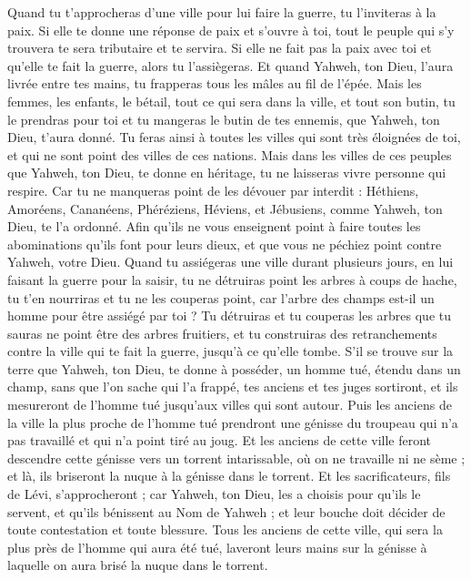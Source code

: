\begin{multicols}{2}
Quand tu t'approcheras d'une ville pour lui faire la guerre, tu l’inviteras à la paix.
Si elle te donne une réponse de paix et s’ouvre à toi, tout le peuple qui s’y trouvera te sera tributaire et te servira.
Si elle ne fait pas la paix avec toi et qu'elle te fait la guerre, alors tu l’assiègeras.
Et quand Yahweh, ton Dieu, l'aura livrée entre tes mains, tu frapperas tous les mâles au fil de l’épée.
Mais les femmes, les enfants, le bétail, tout ce qui sera dans la ville, et tout son butin, tu le prendras pour toi et tu mangeras le butin de tes ennemis, que Yahweh, ton Dieu, t'aura donné.
Tu feras ainsi à toutes les villes qui sont très éloignées de toi, et qui ne sont point des villes de ces nations.
Mais dans les villes de ces peuples que Yahweh, ton Dieu, te donne en héritage, tu ne laisseras vivre personne qui respire.
Car tu ne manqueras point de les dévouer par interdit : Héthiens, Amoréens, Cananéens, Phéréziens, Héviens, et Jébusiens, comme Yahweh, ton Dieu, te l'a ordonné.
Afin qu'ils ne vous enseignent point à faire toutes les abominations qu'ils font pour leurs dieux, et que vous ne péchiez point contre Yahweh, votre Dieu.
Quand tu assiégeras une ville durant plusieurs jours, en lui faisant la guerre pour la saisir, tu ne détruiras point les arbres à coups de hache, tu t’en nourriras et tu ne les couperas point, car l'arbre des champs est-il un homme pour être assiégé par toi ?
Tu détruiras et tu couperas les arbres que tu sauras ne point être des arbres fruitiers, et tu construiras des retranchements contre la ville qui te fait la guerre, jusqu'à ce qu'elle tombe.
\VerseOne{}S’il se trouve sur la terre que Yahweh, ton Dieu, te donne à posséder, un homme tué, étendu dans un champ, sans que l’on sache qui l’a frappé,
tes anciens et tes juges sortiront, et ils mesureront de l’homme tué jusqu'aux villes qui sont autour.
Puis les anciens de la ville la plus proche de l'homme tué prendront une génisse du troupeau qui n’a pas travaillé et qui n'a point tiré au joug.
Et les anciens de cette ville feront descendre cette génisse vers un torrent intarissable, où on ne travaille ni ne sème ; et là, ils briseront la nuque à la génisse dans le torrent.
Et les sacrificateurs, fils de Lévi, s'approcheront ; car Yahweh, ton Dieu, les a choisis pour qu’ils le servent, et qu’ils bénissent au Nom de Yahweh ; et leur bouche doit décider de toute contestation et toute blessure.
Tous les anciens de cette ville, qui sera la plus près de l'homme qui aura été tué, laveront leurs mains sur la génisse à laquelle on aura brisé la nuque dans le torrent.

\end{multicols}
